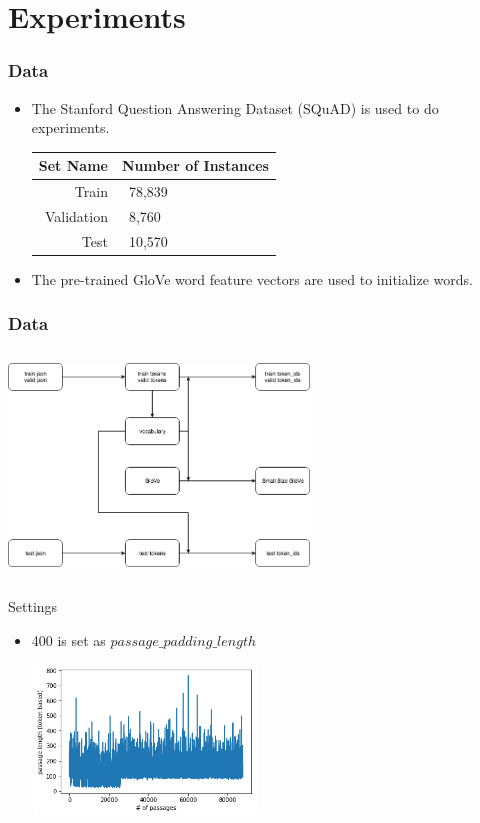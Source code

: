\documentclass{beamer}
\begin{document}
\section{Experiments}

\begin{frame} \frametitle{Data}
    \begin{itemize}
        \item The Stanford Question Answering Dataset (SQuAD) is used to do experiments.
        \begin{table}[htbp]\centering
          \begin{tabular}{|r|l|} \hline
            Set Name & Number of Instances \\ \hline\hline
            Train & \ 78,839 \\
            Validation & \ 8,760 \\
            Test & \ 10,570 \\ \hline
          \end{tabular}
        \end{table}
        \item The pre-trained GloVe word feature vectors are used to initialize words.
    \end{itemize}
\end{frame}

\begin{frame}\frametitle{Data}
    \begin{center}
        \includegraphics[width=8cm, height=6cm]{figures/data.png}
    \end{center}
\end{frame}

\begin{frame}{Settings}
    \begin{itemize}
        \item 400 is set as $passage\_padding\_length$
            \begin{center}
                \includegraphics[width=6cm, height=4cm]{figures/passage_length.png}
            \end{center}
    \end{itemize}
\end{frame}
\end{document}
